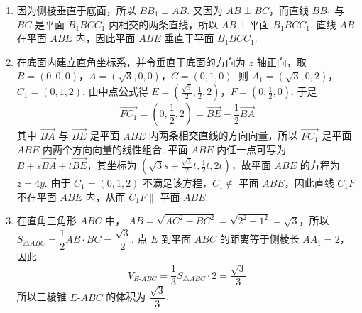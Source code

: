 \begin{solution}
\begin{enumerate}
\item 因为侧棱垂直于底面，所以 \(BB_1\perp AB\). 又因为 \(AB\perp BC\)，而直线 \(BB_1\) 与 \(BC\) 是平面 \(B_1BCC_1\) 内相交的两条直线，所以
\(AB\perp\text{平面 }B_1BCC_1\). 直线 \(AB\) 在平面 \(ABE\) 内，因此平面 \(ABE\) 垂直于平面 \(B_1BCC_1\).

\item 在底面内建立直角坐标系，并令垂直于底面的方向为 \(z\) 轴正向，取 \(B=(0,0,0)\)，\(A=(\sqrt{3},0,0)\)，\(C=(0,1,0)\). 则 \(A_1=(\sqrt{3},0,2)\)，\(C_1=(0,1,2)\). 由中点公式得 \(E=\left(\frac{\sqrt{3}}{2},\frac{1}{2},2\right)\)，\(F=\left(0,\frac{1}{2},0\right)\). 于是
\[
\overrightarrow{FC_1}=\left(0,\frac{1}{2},2\right)=\overrightarrow{BE}-\frac{1}{2}\overrightarrow{BA}
\]
其中 \(\overrightarrow{BA}\) 与 \(\overrightarrow{BE}\) 是平面 \(ABE\) 内两条相交直线的方向向量，所以 \(\overrightarrow{FC_1}\) 是平面 \(ABE\) 内两个方向向量的线性组合. 平面 \(ABE\) 内任一点可写为
\(B+s\overrightarrow{BA}+t\overrightarrow{BE}\)，其坐标为 \(\left(\sqrt{3}s+\frac{\sqrt{3}}{2}t,\frac{1}{2}t,2t\right)\)，故平面 \(ABE\) 的方程为 \(z=4y\). 由于 \(C_1=(0,1,2)\) 不满足该方程，\(C_1\notin\) 平面 \(ABE\)，因此直线 \(C_1F\) 不在平面 \(ABE\) 内，从而 \(C_1F\parallel\) 平面 \(ABE\).

\item 在直角三角形 \(ABC\) 中，
\(AB=\sqrt{AC^2-BC^2}=\sqrt{2^2-1^2}=\sqrt{3}\)，所以
\(S_{\triangle ABC}=\dfrac{1}{2}AB\cdot BC=\dfrac{\sqrt{3}}{2}\). 点 \(E\) 到平面 \(ABC\) 的距离等于侧棱长 \(AA_1=2\)，因此
\[
V_{E\text{-}ABC}=\frac{1}{3}S_{\triangle ABC}\cdot2=\frac{\sqrt{3}}{3}
\]
所以三棱锥 \(E\text{-}ABC\) 的体积为 \(\dfrac{\sqrt{3}}{3}\).
\end{enumerate}
\end{solution}

\FloatBarrier

